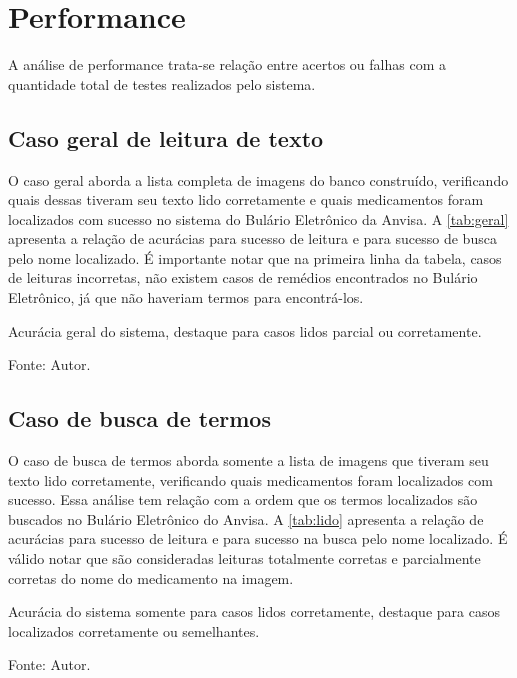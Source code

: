 
\section{Performance}

A análise de performance trata-se relação entre acertos ou falhas com a quantidade total de testes realizados pelo sistema.

\subsection{Caso geral de leitura de texto}

O caso geral aborda a lista completa de imagens do banco construído, verificando quais dessas tiveram seu texto lido corretamente e quais medicamentos foram localizados com sucesso no sistema do Bulário Eletrônico da \ac{Anvisa}.
A \autoref{tab:geral} apresenta a relação de acurácias para sucesso de leitura e para sucesso de busca pelo nome localizado.
É importante notar que na primeira linha da tabela, casos de leituras incorretas, não existem casos de remédios encontrados no Bulário Eletrônico, já que não haveriam termos para encontrá-los.

\begin{table}[htbp]
    \centering
    \caption{Acurácia geral do sistema, destaque para casos lidos parcial ou corretamente.}
    \medskip
    \caption*{Fonte: Autor.}
    \label{tab:geral}
\end{table}

\subsection{Caso de busca de termos}

O caso de busca de termos aborda somente a lista de imagens que tiveram seu texto lido corretamente, verificando quais medicamentos foram localizados com sucesso.
Essa análise tem relação com a ordem que os termos localizados são buscados no Bulário Eletrônico do \ac{Anvisa}.
A \autoref{tab:lido} apresenta a relação de acurácias para sucesso de leitura e para sucesso na busca pelo nome localizado.
É válido notar que são consideradas leituras totalmente corretas e parcialmente corretas do nome do medicamento na imagem.

\begin{table}[htbp]
    \centering
    \caption{Acurácia do sistema somente para casos lidos corretamente, destaque para casos localizados corretamente ou semelhantes.}
    \medskip
    \caption*{Fonte: Autor.}
    \label{tab:lido}
\end{table}

